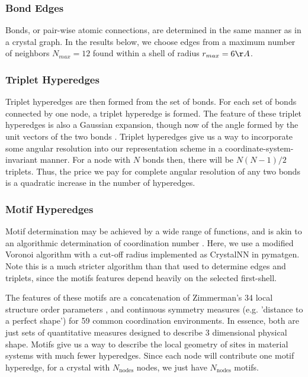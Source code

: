 \documentclass[twoside,twocolumn,9pt]{article}
\begin{document}
\subsubsection{Bond Edges}
Bonds, or pair-wise atomic connections, are determined in the same manner as in a crystal graph. In the results below, we choose edges from a maximum number of neighbors $N_{max}=12$ found within a shell of radius $r_{max}=6\AA$. 

\subsubsection{Triplet Hyperedges}
Triplet hyperedges are then formed from the set of bonds. For each set of bonds connected by one node, a triplet hyperedge is formed. The feature of these triplet hyperedges is also a Gaussian expansion, though now of the angle formed by the unit vectors of the two bonds \cite{alignn}.
Triplet hyperedges give us a way to incorporate some angular resolution into our representation scheme in a coordinate-system-invariant manner.
For a node with $N$ bonds then, there will be $N(N-1)/2$ triplets. Thus, the price we pay for complete angular resolution of any two bonds is a quadratic increase in the number of hyperedges.








\subsubsection{Motif Hyperedges}
Motif determination may be achieved by a wide range of functions, and is akin to an algorithmic determination of coordination number \cite{coordination_comp}. Here, we use a modified Voronoi algorithm with a cut-off radius implemented as CrystalNN in pymatgen.
Note this is a much stricter algorithm than that used to determine edges and triplets, since the motifs features depend heavily on the selected first-shell.

The features of these motifs are a concatenation of Zimmerman's 34 local structure order parameters \cite{orderparam1,orderparam2}, and continuous symmetry measures \cite{csm_polyhedra} (e.g. 'distance to a perfect shape') for 59 common coordination environments. In essence, both are just sets of quantitative measures designed to describe 3 dimensional physical shape. 
Motifs give us a way to describe the local geometry of sites in material systems with much fewer hyperedges. Since each node will contribute one motif hyperedge, for a crystal with $N_{\text{nodes}}$ nodes, we just have $N_{\text{nodes}}$ motifs. 
\end{document}
